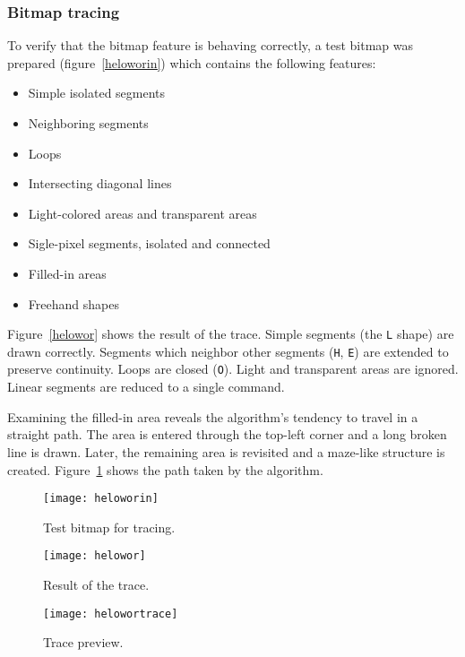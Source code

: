 \subsubsection{Bitmap tracing}

To verify that the bitmap feature is behaving correctly, a test bitmap was
prepared (figure~\ref{heloworin}) which contains the following features:
\begin{itemize}
    \item Simple isolated segments
    \item Neighboring segments
    \item Loops
    \item Intersecting diagonal lines
    \item Light-colored areas and transparent areas
    \item Sigle-pixel segments, isolated and connected
    \item Filled-in areas
    \item Freehand shapes
\end{itemize}
Figure~\ref{helowor} shows the result of the trace. Simple segments (the
\texttt{L} shape) are drawn correctly. Segments which neighbor other segments
(\texttt{H}, \texttt{E}) are extended to preserve continuity. Loops are closed
(\texttt{O}). Light and transparent areas are ignored. Linear segments are
reduced to a single command.

Examining the filled-in area reveals the algorithm's tendency to travel in a
straight path. The area is entered through the top-left corner and a long broken
line is drawn. Later, the remaining area is revisited and a maze-like structure
is created. Figure~\ref{helowortrace} shows the path taken by the algorithm.

\begin{figure}[ht]
    \begin{minipage}{0.5\textwidth}
        \centering
        \texttt{[image: heloworin]}
        \caption{Test bitmap for tracing.}
        \label{heloworin}
    \end{minipage}\hfill
    \begin{minipage}{0.5\textwidth}
        \centering
        \texttt{[image: helowor]}
        \caption{Result of the trace.}
        \label{helowor}
    \end{minipage}
    \begin{minipage}{0.5\textwidth}
        \centering
        \texttt{[image: helowortrace]}
        \caption{Trace preview.}
        \label{helowortrace}
    \end{minipage}
\end{figure}

